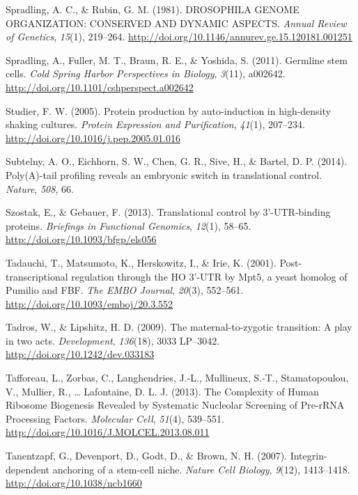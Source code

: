 \documentclass[12pt,twoside]{reedthesis}
\newlength{\cslhangindent}
\newenvironment{cslreferences}%
  {\setlength{\parindent}{0pt}%
  \everypar{\setlength{\hangindent}{\cslhangindent}}\ignorespaces}%
  {\par}
\begin{document}
\begin{cslreferences}
\leavevmode\hypertarget{ref-Spradling1981b}{}%
Spradling, A. C., \& Rubin, G. M. (1981). DROSOPHILA GENOME ORGANIZATION: CONSERVED AND DYNAMIC ASPECTS. \emph{Annual Review of Genetics}, \emph{15}(1), 219--264. \url{http://doi.org/10.1146/annurev.ge.15.120181.001251}

\leavevmode\hypertarget{ref-Spradling2011f}{}%
Spradling, A., Fuller, M. T., Braun, R. E., \& Yoshida, S. (2011). Germline stem cells. \emph{Cold Spring Harbor Perspectives in Biology}, \emph{3}(11), a002642. \url{http://doi.org/10.1101/cshperspect.a002642}

\leavevmode\hypertarget{ref-studierProteinProductionAutoinduction2005}{}%
Studier, F. W. (2005). Protein production by auto-induction in high-density shaking cultures. \emph{Protein Expression and Purification}, \emph{41}(1), 207--234. \url{http://doi.org/10.1016/j.pep.2005.01.016}

\leavevmode\hypertarget{ref-Subtelny2014a}{}%
Subtelny, A. O., Eichhorn, S. W., Chen, G. R., Sive, H., \& Bartel, D. P. (2014). Poly(A)-tail profiling reveals an embryonic switch in translational control. \emph{Nature}, \emph{508}, 66.

\leavevmode\hypertarget{ref-Szostak2013l}{}%
Szostak, E., \& Gebauer, F. (2013). Translational control by 3'-UTR-binding proteins. \emph{Briefings in Functional Genomics}, \emph{12}(1), 58--65. \url{http://doi.org/10.1093/bfgp/els056}

\leavevmode\hypertarget{ref-Tadauchi2001a}{}%
Tadauchi, T., Matsumoto, K., Herskowitz, I., \& Irie, K. (2001). Post-transcriptional regulation through the HO 3'-UTR by Mpt5, a yeast homolog of Pumilio and FBF. \emph{The EMBO Journal}, \emph{20}(3), 552--561. \url{http://doi.org/10.1093/emboj/20.3.552}

\leavevmode\hypertarget{ref-Tadros2009c}{}%
Tadros, W., \& Lipshitz, H. D. (2009). The maternal-to-zygotic transition: A play in two acts. \emph{Development}, \emph{136}(18), 3033 LP--3042. \url{http://doi.org/10.1242/dev.033183}

\leavevmode\hypertarget{ref-Tafforeau2013a}{}%
Tafforeau, L., Zorbas, C., Langhendries, J.-L., Mullineux, S.-T., Stamatopoulou, V., Mullier, R., \ldots{} Lafontaine, D. L. J. (2013). The Complexity of Human Ribosome Biogenesis Revealed by Systematic Nucleolar Screening of Pre-rRNA Processing Factors. \emph{Molecular Cell}, \emph{51}(4), 539--551. \url{http://doi.org/10.1016/J.MOLCEL.2013.08.011}

\leavevmode\hypertarget{ref-tanentzapfIntegrindependentAnchoringStemcell2007}{}%
Tanentzapf, G., Devenport, D., Godt, D., \& Brown, N. H. (2007). Integrin-dependent anchoring of a stem-cell niche. \emph{Nature Cell Biology}, \emph{9}(12), 1413--1418. \url{http://doi.org/10.1038/ncb1660}


\end{cslreferences}
\end{document}
